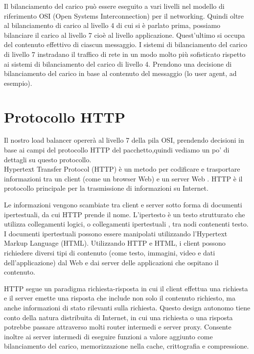 \documentclass[binding=0.6cm]{sapthesis}
\theoremstyle{definition}
\begin{document}
Il bilanciamento del carico può essere eseguito a vari livelli nel modello di 
riferimento OSI (Open Systems Interconnection) per il networking.
Quindi oltre al bilanciamento di carico al livello 4 di cui si è parlato prima, possiamo bilanciare
il carico al livello 7 cioè al livello applicazione.
Quest'ultimo si occupa del contenuto effettivo di ciascun messaggio. 
I sistemi di bilanciamento del carico di livello 7 instradano il traffico di rete in un modo molto
più sofisticato rispetto ai sistemi di bilanciamento del carico di livello 4.
Prendono una decisione di bilanciamento del carico in base al contenuto
del messaggio (lo user agent, ad esempio).
\section{Protocollo HTTP }
\label{chapter:http}
Il nostro load balancer opererà al livello 7 della pila OSI, prendendo decisioni in base ai campi
del protocollo HTTP del pacchetto,quindi vediamo un po' di dettagli su questo protocollo.
\cite{Reti di calcolatori}\\
Hypertext Transfer Protocol (HTTP) è un metodo per codificare e trasportare informazioni tra un client (come un browser Web) e un server Web . HTTP è il protocollo principale per la trasmissione di informazioni su Internet.

Le informazioni vengono scambiate tra client e server sotto forma di documenti ipertestuali, da cui HTTP prende il nome. L'ipertesto è un testo strutturato che utilizza collegamenti logici, o collegamenti ipertestuali , tra nodi contenenti testo. I documenti ipertestuali possono essere manipolati utilizzando l'Hypertext Markup Language (HTML). Utilizzando HTTP e HTML, i client possono richiedere diversi tipi di contenuto (come testo, immagini, video e dati dell'applicazione) dal Web e dai server delle applicazioni che ospitano il contenuto.

HTTP segue un paradigma richiesta-risposta in cui il client effettua una richiesta e il server emette una risposta che include non solo il contenuto richiesto, ma anche informazioni di stato rilevanti sulla richiesta. Questo design autonomo tiene conto della natura distribuita di Internet, in cui una richiesta o una risposta potrebbe passare attraverso molti router intermedi e server proxy. Consente inoltre ai server intermedi di eseguire funzioni a valore aggiunto come bilanciamento del carico, memorizzazione nella cache, crittografia e compressione.
\end{document}
